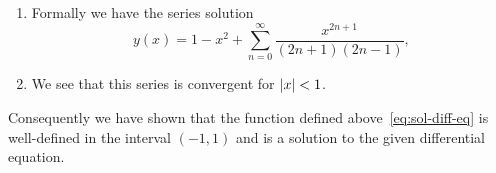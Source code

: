 \begin{solution}
\begin{enumerate}
    \item Formally we have the series solution
          \begin{equation}
            \label{eq:sol-diff-eq}
            y(x) = 1 - x^2 + \sum_{n=0}^{\infty} \frac{x^{2n+1}}{(2n+1)(2n-1)},
          \end{equation}
    \item We see that this series is convergent for \(\left|x\right|<1\).
  \end{enumerate}
  Consequently we have shown that the function defined above~\eqref{eq:sol-diff-eq} is well-defined in the interval \((-1,1)\) and is a solution to the given differential equation.
\end{solution}










